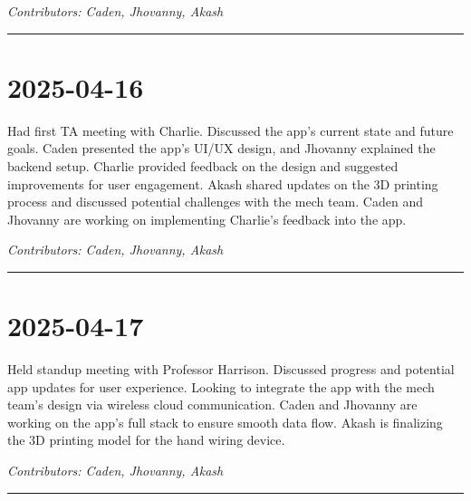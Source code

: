 \documentclass[12pt]{article}
\begin{document}
\vspace{1em}
\noindent\textit{Contributors: Caden, Jhovanny, Akash}
\vspace{1em}
\hrule

\section*{2025-04-16}
Had first TA meeting with Charlie. Discussed the app's current state and future goals. Caden presented the app's UI/UX design, and Jhovanny explained the backend setup. Charlie provided feedback on the design and suggested improvements for user engagement. Akash shared updates on the 3D printing process and discussed potential challenges with the mech team.
Caden and Jhovanny are working on implementing Charlie's feedback into the app. 

\vspace{1em}
\noindent\textit{Contributors: Caden, Jhovanny, Akash}
\vspace{1em}
\hrule

\section*{2025-04-17}
Held standup meeting with Professor Harrison. Discussed progress and potential app updates for user experience. Looking to integrate the app with the mech team's design via wireless cloud communication. Caden and Jhovanny are working on the app's full stack to ensure smooth data flow. Akash is finalizing the 3D printing model for the hand wiring device.

\vspace{1em}
\noindent\textit{Contributors: Caden, Jhovanny, Akash}
\vspace{1em}
\hrule
\end{document}
